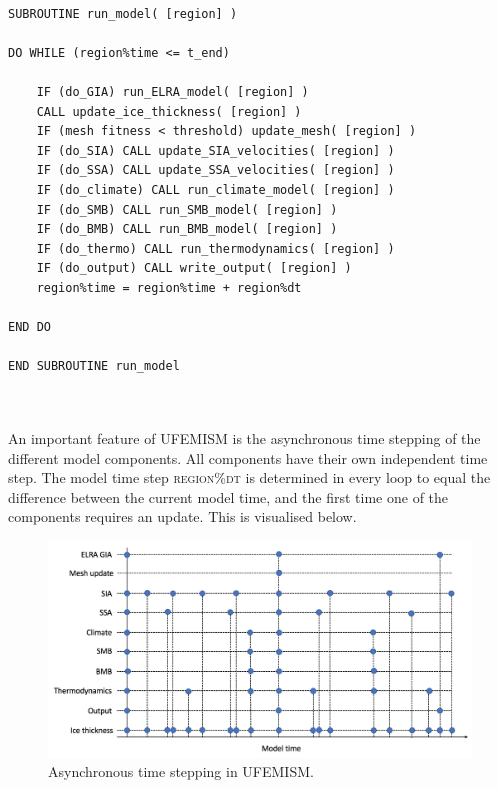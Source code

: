 \documentclass{article}
\begin{document}
\hrulefill
\begin{lstlisting}

SUBROUTINE run_model( [region] )

DO WHILE (region%time <= t_end)

	IF (do_GIA) run_ELRA_model( [region] )
	CALL update_ice_thickness( [region] )
	IF (mesh fitness < threshold) update_mesh( [region] )
	IF (do_SIA) CALL update_SIA_velocities( [region] )
	IF (do_SSA) CALL update_SSA_velocities( [region] )
	IF (do_climate) CALL run_climate_model( [region] )
	IF (do_SMB) CALL run_SMB_model( [region] )
	IF (do_BMB) CALL run_BMB_model( [region] )
	IF (do_thermo) CALL run_thermodynamics( [region] )
	IF (do_output) CALL write_output( [region] )
	region%time = region%time + region%dt

END DO

END SUBROUTINE run_model

\end{lstlisting}
\hrulefill
\\
\\
An important feature of UFEMISM is the asynchronous time stepping of the different model components. All components have their own independent time step. The model time step \textsc{region\%dt} is determined in every loop to equal the difference between the current model time, and the first time one of the components requires an update. This is visualised below.

\begin{figure}[h!] \label{fig:timestep}
  \includegraphics[width=0.9\linewidth]{Fig_timestep_UFEMISM.png}
  \caption{Asynchronous time stepping in UFEMISM.}
\end{figure}
\end{document}
